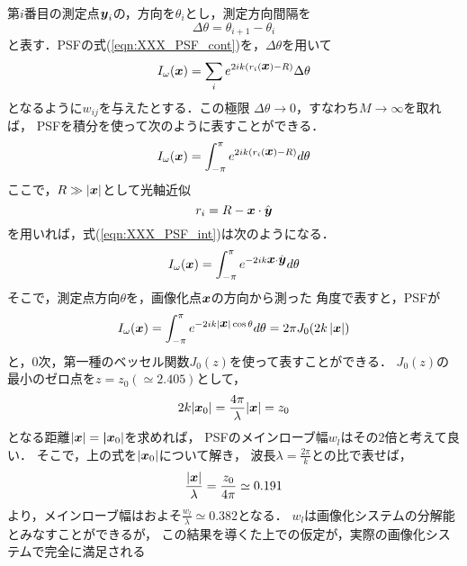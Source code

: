 第$i$番目の測定点$\mbox{\boldmath $y$}_i$の，方向を$\theta_i$とし，測定方向間隔を
\begin{equation}
	\Delta \theta = \theta_{i+1}-\theta_i
	\label{eqn:}
\end{equation}
と表す．PSFの式(\ref{eqn:XXX_PSF_cont})を，$\Delta \theta$を用いて
\begin{equation}
	I_\omega(\mbox{\boldmath $x$})
		=
	\sum_{i} 
	e^{
	2ik
	\left(
		r_i(\mbox{\boldmath $x$})-R
	\right)
	}
	\Delta \theta
	\label{eqn:XXX_PSF_dth}
\end{equation}
となるように$w_{ij}$を与えたとする．この極限
$\Delta \theta \rightarrow 0$，すなわち$M\rightarrow \infty$を取れば，
PSFを積分を使って次のように表すことができる．
\begin{equation}
	I_\omega(\mbox{\boldmath $x$})
		=
	\int_{-\pi}^{\pi}
	e^{
	2ik
	\left(
		r_i(\mbox{\boldmath $x$})-R
	\right)
	}
	d\theta
	\label{eqn:XXX_PSF_int}
\end{equation}
ここで，$R\gg |\mbox{\boldmath $x$}|$として光軸近似
\begin{equation}
	r_i=R-\mbox{\boldmath $x$}\cdot \hat{\mbox{\boldmath $y$}}
	\label{eqn:}
\end{equation}
を用いれば，式(\ref{eqn:XXX_PSF_int})は次のようになる．
\begin{equation}
	I_\omega(\mbox{\boldmath $x$})
		=
	\int_{-\pi}^{\pi}
	e^{
	-2ik \mbox{\boldmath $x$}\cdot \hat{\mbox{\boldmath $y$}}
	}
	d\theta
	\label{eqn:XXX_PSF_int2}
\end{equation}
そこで，測定点方向$\theta$を，画像化点$\mbox{\boldmath $x$}$の方向から測った
角度で表すと，PSFが
\begin{equation}
	I_\omega(\mbox{\boldmath $x$})
		=
	\int_{-\pi}^{\pi}
	e^{
	-2ik |\mbox{\boldmath $x$}| \cos \theta
	}
	d\theta
	=
	2\pi J_0(2k\left|\mbox{\boldmath $x$}\right|)
	\label{eqn:XXX_PSF_J0}
\end{equation}
と，0次，第一種のベッセル関数$J_0(z)$を使って表すことができる．
$J_0(z)$の最小のゼロ点を$z=z_0(\simeq 2.405)$として，
\begin{equation}
	2k|\mbox{\boldmath $x$}_0|=\frac{4\pi}{\lambda}|\mbox{\boldmath $x$}|=z_0
	\label{eqn:}
\end{equation}
となる距離$|\mbox{\boldmath $x$}|=\mbox{\boldmath $|$}\mbox{\boldmath $x$}_0|$を求めれば，
PSFのメインローブ幅$w_{l}$はその2倍と考えて良い．
そこで，上の式を$|\mbox{\boldmath $x$}_0|$について解き，
波長$\lambda=\frac{2\pi}{k}$との比で表せば，
\begin{equation}
	\frac{|\mbox{\boldmath $x$}|}{\lambda}=\frac{z_0}{4\pi}\simeq 0.191
	\label{eqn:}
\end{equation}
より，メインローブ幅はおよそ$\frac{w_l}{\lambda}\simeq 0.382$となる．
$w_l$は画像化システムの分解能とみなすことができるが，
この結果を導くた上での仮定が，実際の画像化システムで完全に満足される
